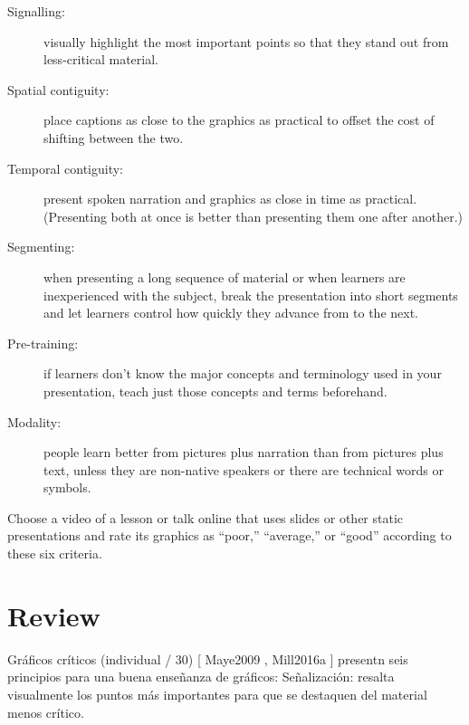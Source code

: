 \begin{description}

\item[Signalling:]
  visually highlight the most important points
  so that they stand out from less-critical material.

\item[Spatial contiguity:]
  place captions as close to the graphics as practical to offset the cost of shifting between the two.

\item[Temporal contiguity:]
  present spoken narration and graphics as close in time as practical.
  (Presenting both at once is better than presenting them one after another.)

\item[Segmenting:]
  when presenting a long sequence of material or when learners are inexperienced with the subject,
  break the presentation into short segments
  and let learners control how quickly they advance from to the next.

\item[Pre-training:]
  if learners don't know the major concepts and terminology used in your presentation,
  teach just those concepts and terms beforehand.

\item[Modality:]
  people learn better from pictures plus narration than from pictures plus text,
  unless they are non-native speakers
  or there are technical words or symbols.

\end{description}

Choose a video of a lesson or talk online that uses slides or other static presentations
and rate its graphics as ``poor,'' ``average,'' or ``good'' according to these six criteria.

\section*{Review}


Gráficos críticos (individual / 30)
[ Maye2009 , Mill2016a ] presentn seis principios para una buena enseñanza de gráficos:
Señalización:
resalta visualmente los puntos más importantes para que se destaquen del material menos crítico.
 
